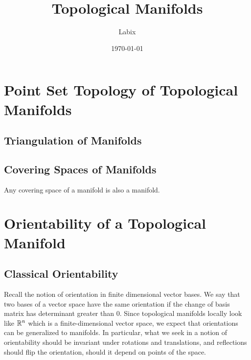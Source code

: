 \documentclass[a4paper]{article}
\title{Topological Manifolds}
\author{Labix}
\date{\today}
\begin{document}
\maketitle
\begin{abstract}
\end{abstract}
\pagebreak
\tableofcontents
\pagebreak

\section{Point Set Topology of Topological Manifolds}
\subsection{Triangulation of Manifolds}
\subsection{Covering Spaces of Manifolds}
\begin{prp}{}{} Any covering space of a manifold is also a manifold. 
\end{prp}

\pagebreak
\section{Orientability of a Topological Manifold}
\subsection{Classical Orientability}
Recall the notion of orientation in finite dimensional vector bases. We say that two bases of a vector space have the same orientation if the change of basis matrix has determinant greater than $0$. Since topological manifolds locally look like $\mathbb{R}^n$ which is a finite-dimensional vector space, we expect that orientations can be generalized to manifolds. In particular, what we seek in a notion of orientability should be invariant under rotations and translations, and reflections should flip the orientation, should it depend on points of the space. \\~\\
\end{document}
